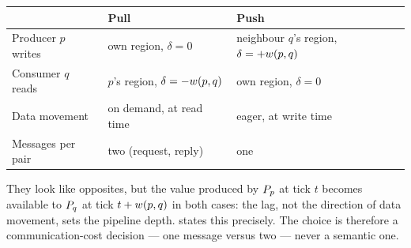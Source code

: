 \begin{center}
\small
\begin{tabular}{@{}lll@{}}
\toprule
 & \textbf{Pull} & \textbf{Push} \\
\midrule
Producer $p$ writes & own region, $\delta = 0$
                    & neighbour $q$'s region, $\delta = +w(p,q)$ \\
Consumer $q$ reads  & $p$'s region, $\delta = -w(p,q)$
                    & own region, $\delta = 0$ \\
Data movement       & on demand, at read time & eager, at write time \\
Messages per pair   & two (request, reply)    & one \\
\bottomrule
\end{tabular}
\end{center}

They look like opposites, but the value produced by $P_{p}$ at tick $t$
becomes available to $P_{q}$ at tick $t + w(p,q)$ in both cases: the
\gls{lag}, not the direction of data movement, sets the pipeline depth.
 states this precisely. The choice is therefore a
communication-cost decision --- one message versus two --- never a semantic
one.